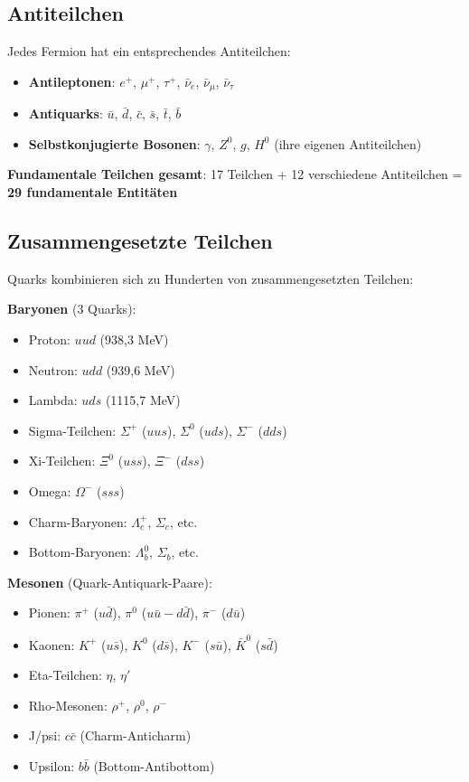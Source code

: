 	\subsection{Antiteilchen}
	
	Jedes Fermion hat ein entsprechendes Antiteilchen:
	
	\begin{itemize}
		\item \textbf{Antileptonen}: $e^+$, $\mu^+$, $\tau^+$, $\bar{\nu}_e$, $\bar{\nu}_\mu$, $\bar{\nu}_\tau$
		\item \textbf{Antiquarks}: $\bar{u}$, $\bar{d}$, $\bar{c}$, $\bar{s}$, $\bar{t}$, $\bar{b}$
		\item \textbf{Selbstkonjugierte Bosonen}: $\gamma$, $Z^0$, $g$, $H^0$ (ihre eigenen Antiteilchen)
	\end{itemize}
	
	\textbf{Fundamentale Teilchen gesamt}: 17 Teilchen + 12 verschiedene Antiteilchen = \textbf{29 fundamentale Entitäten}
	
	\subsection{Zusammengesetzte Teilchen}
	
	Quarks kombinieren sich zu Hunderten von zusammengesetzten Teilchen:
	
	\textbf{Baryonen} (3 Quarks):
	\begin{itemize}
		\item Proton: $uud$ (938{,}3 MeV)
		\item Neutron: $udd$ (939{,}6 MeV)
		\item Lambda: $uds$ (1115{,}7 MeV)
		\item Sigma-Teilchen: $\Sigma^+$ ($uus$), $\Sigma^0$ ($uds$), $\Sigma^-$ ($dds$)
		\item Xi-Teilchen: $\Xi^0$ ($uss$), $\Xi^-$ ($dss$)
		\item Omega: $\Omega^-$ ($sss$)
		\item Charm-Baryonen: $\Lambda_c^+$, $\Sigma_c$, etc.
		\item Bottom-Baryonen: $\Lambda_b^0$, $\Sigma_b$, etc.
	\end{itemize}
	
	\textbf{Mesonen} (Quark-Antiquark-Paare):
	\begin{itemize}
		\item Pionen: $\pi^+$ ($u\bar{d}$), $\pi^0$ ($u\bar{u} - d\bar{d}$), $\pi^-$ ($d\bar{u}$)
		\item Kaonen: $K^+$ ($u\bar{s}$), $K^0$ ($d\bar{s}$), $K^-$ ($s\bar{u}$), $\bar{K}^0$ ($s\bar{d}$)
		\item Eta-Teilchen: $\eta$, $\eta'$
		\item Rho-Mesonen: $\rho^+$, $\rho^0$, $\rho^-$
		\item J/psi: $c\bar{c}$ (Charm-Anticharm)
		\item Upsilon: $b\bar{b}$ (Bottom-Antibottom)
	\end{itemize}
	
